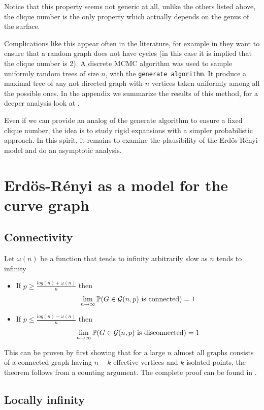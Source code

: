 Notice that this property seems not generic at all, unlike the others listed above, the clique number is the only property which actually depends on the genus of the surface.

Complications like this appear often in the literature, for example in \cite{Alcazar15} they want to ensure that a random graph does not have cycles (in this case it is implied that the clique number is 2). A discrete MCMC algorithm was used to sample uniformly random trees of size $n$, with the \texttt{generate algorithm}. It produce a maximal tree of any not directed graph with $n$ vertices taken uniformly among all the possible ones. In the appendix we summarize the results of this method, for a deeper analysis look at \cite{Broder89}.

Even if we can provide an analog of the generate algorithm to ensure a fixed clique number, the idea is to study rigid expansions with a simpler probabilistic approach. In this spirit, it remains to examine the plausibility of the Erdös-Rényi model and do an asymptotic analysis.

\section{Erdös-Rényi as a model for the curve graph}

\subsection{Connectivity}
\begin{theorem}
Let $\omega(n)$ be a function that tends to infinity arbitrarily slow as $n$ tends to infinity
\begin{itemize}
\item If $p\geq \frac{log(n)+ \omega(n)}{n}$ then 
$$\lim_{n \to \infty} \mathbb{P}(G \in \mathcal{G}(n,p) \text{ is connected}) = 1$$
\item If $p\leq \frac{log(n)- \omega(n)}{n}$ then
$$\lim_{n \to \infty} \mathbb{P}(G \in \mathcal{G}(n,p) \text{ is disconnected}) = 1$$
\end{itemize}
\end{theorem}
 
This can be proven by first showing that for a large $n$ almost all graphs consists of a connected graph having $n-k$ effective vertices and $k$ isolated points, the theorem follows from a counting argument. The complete proof can be found in \cite[Erdös-Rényi, p. 59]{OnRandomGraphs}.
 
\subsection{Locally infinity}

